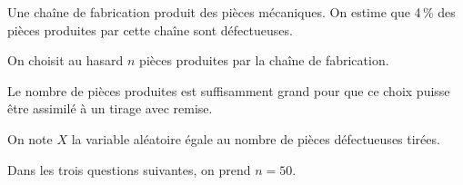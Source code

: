 
\medskip

%

Une chaîne de fabrication produit des pièces mécaniques. On estime que 4\,\% des pièces produites par cette chaîne sont défectueuses.

On choisit au hasard $n$ pièces produites par la chaîne de fabrication. 

Le nombre de pièces produites est suffisamment grand pour que ce choix puisse être assimilé à un tirage avec remise. 

On note $X$ la variable aléatoire égale au nombre de pièces défectueuses tirées.

Dans les trois questions suivantes, on prend $n = 50$.

\medskip

